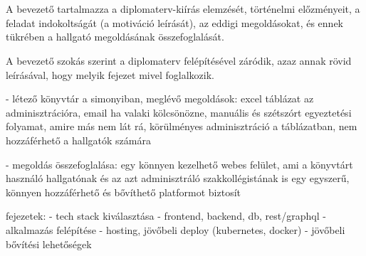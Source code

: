 \chapter{\bevezetes}

A bevezető tartalmazza a diplomaterv-kiírás elemzését, történelmi előzményeit, a feladat indokoltságát (a motiváció leírását), az eddigi megoldásokat, és ennek tükrében a hallgató megoldásának összefoglalását.

A bevezető szokás szerint a diplomaterv felépítésével záródik, azaz annak rövid leírásával, hogy melyik fejezet mivel foglalkozik.

- létező könyvtár a simonyiban, meglévő megoldások: excel táblázat az adminisztrációra, email ha valaki kölcsönözne, manuális és szétszórt egyeztetési folyamat,
amire más nem lát rá, körülményes adminisztráció a táblázatban, nem hozzáférhető a hallgatók számára

- megoldás összefoglalása: egy könnyen kezelhető webes felület, ami a könyvtárt használó hallgatónak és az azt adminisztráló szakkollégistának is egy egyszerű,
könnyen hozzáférhető és bővíthető platformot biztosít

fejezetek:
- tech stack kiválasztása
  - frontend, backend, db, rest/graphql
- alkalmazás felépítése
- hosting, jövőbeli deploy (kubernetes, docker)
- jövőbeli bővítési lehetőségek
